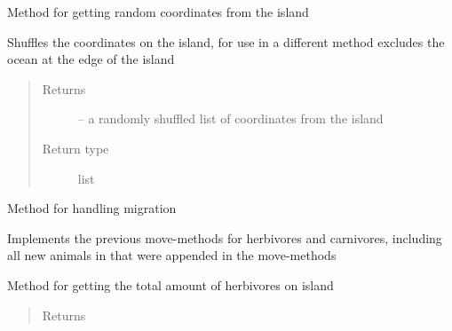 \documentclass[a4paper,10pt,english]{sphinxmanual}
\begin{document}
\begin{fulllineitems}
\begin{fulllineitems}
\begin{quote}
\begin{description}
\end{description}\end{quote}

\end{fulllineitems}


\begin{fulllineitems}
\label{\detokenize{island:biosim.island.Island.get_random_coordinates}}
Method for getting random coordinates from the island

Shuffles the coordinates on the island, for use in a different method
excludes the ocean at the edge of the island
\begin{quote}\begin{description}
\item[{Returns}] \leavevmode
{} -- a randomly shuffled list of coordinates from the island

\item[{Return type}] \leavevmode
list

\end{description}\end{quote}

\end{fulllineitems}


\begin{fulllineitems}
\label{\detokenize{island:biosim.island.Island.migration}}
Method for handling migration

Implements the previous move-methods for herbivores and carnivores,
including all new animals in that were appended in the move-methods

\end{fulllineitems}


\begin{fulllineitems}
\label{\detokenize{island:biosim.island.Island.number_of_carnivores_island}}
Method for getting the total amount of herbivores on island
\begin{quote}\begin{description}
\item[{Returns}] \leavevmode



\end{description}
\end{quote}
\end{fulllineitems}
\end{fulllineitems}
\end{document}
